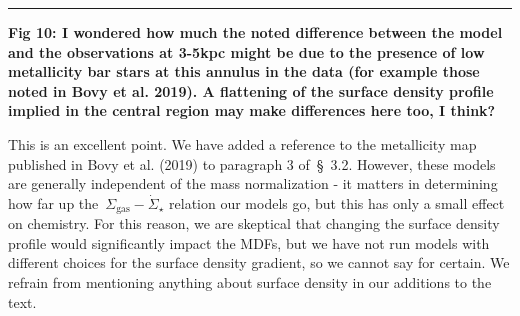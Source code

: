 \documentclass{report}
\newcommand{\breakline}{\noindent\rule{\textwidth}{1pt}}
\begin{document}
\par\null\par 
\breakline 
\par\null\par 
\textbf{
	Fig 10: I wondered how much the noted difference between the model and the 
	observations at 3-5kpc might be due to the presence of low metallicity bar 
	stars at this annulus in the data (for example those noted in Bovy et al. 
	2019). 
	A flattening of the surface density profile implied in the central region 
	may make differences here too, I think?
} 
\par 
This is an excellent point. 
We have added a reference to the metallicity map published in Bovy et al. 
(2019) to paragraph 3 of~\S~3.2. 
However, these models are generally independent of the mass normalization - it 
matters in determining how far up the~$\Sigma_\text{gas}-\dot{\Sigma}_\star$ 
relation our models go, but this has only a small effect on chemistry. 
For this reason, we are skeptical that changing the surface density profile 
would significantly impact the MDFs, but we have not run models with different 
choices for the surface density gradient, so we cannot say for certain. 
We refrain from mentioning anything about surface density in our additions 
to the text. 
\end{document}
